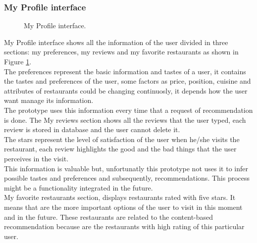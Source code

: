 \subsubsection{My Profile interface}

\begin{figure}
\captionsetup{font=footnotesize}
\centering
{}
\caption{My Profile interface.}
\label{fig:myprofile}   
\end{figure}
My Profile interface shows all the information of the user divided in
three sections: my preferences, my reviews and my favorite restaurants
as shown in Figure  \ref{fig:myprofile}. \\The preferences represent the basic
information and tastes of a user, it contains the tastes and preferences
of the user, some factors as price, position, cuisine and attributes
of restaurants could be changing continuosly, it depends how the user
want manage its information.\\ The prototype uses this information every
time that a request of recommendation is done.
The My reviews section shows all the reviews that the user typed, each
review is stored in database and the user cannot delete it. \\The stars
represent the level of satisfaction of the user when he/she visits the
restaurant, each review highlights the good and the bad things that
the user perceives in the visit. \\This information is valuable but,
unfortunatly this prototype not uses it to infer possible tastes and
preferences and subsequently, recommendations. This process might be a
functionality integrated in the future.\\
My favorite restaurants section, displays restaurants rated with five
stars. It means that are the more important options of the user to
visit in this moment and in the future. These restaurants are related
to the content-based recommendation because are the restaurants with
high rating of this particular user.


